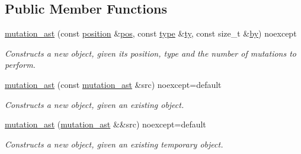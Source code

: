 \subsection*{Public Member Functions}
\begin{DoxyCompactItemize}
\item 
\hypertarget{classbfjit_1_1mutation__ast_aa4c4051e73b3e286a7587264de13c6fb}{}\label{classbfjit_1_1mutation__ast_aa4c4051e73b3e286a7587264de13c6fb} 
\hyperlink{classbfjit_1_1mutation__ast_aa4c4051e73b3e286a7587264de13c6fb}{mutation\+\_\+ast} (const \hyperlink{classbfjit_1_1position}{position} \&\hyperlink{classbfjit_1_1ast_a748b75683a33e11ad87b907ba0118c3d}{pos}, const \hyperlink{classbfjit_1_1mutation__ast_a4a35ab616dab7944deedac4300f473e9}{type} \&\hyperlink{classbfjit_1_1mutation__ast_a8f80ac1d17d4c77c1e5032f970e15e8e}{ty}, const size\+\_\+t \&\hyperlink{classbfjit_1_1mutation__ast_a2ee0d76e3a8aabee083952aea21035a5}{by}) noexcept
\begin{DoxyCompactList}\small\item\em Constructs a new object, given its position, type and the number of mutations to perform. \end{DoxyCompactList}\item 
\hypertarget{classbfjit_1_1mutation__ast_a13a88c3bab4ad64b00c5f00cb553a4df}{}\label{classbfjit_1_1mutation__ast_a13a88c3bab4ad64b00c5f00cb553a4df} 
\hyperlink{classbfjit_1_1mutation__ast_a13a88c3bab4ad64b00c5f00cb553a4df}{mutation\+\_\+ast} (const \hyperlink{classbfjit_1_1mutation__ast}{mutation\+\_\+ast} \&src) noexcept=default
\begin{DoxyCompactList}\small\item\em Constructs a new object, given an existing object. \end{DoxyCompactList}\item 
\hypertarget{classbfjit_1_1mutation__ast_a79a438bf768cea7e786ff38c971dd9aa}{}\label{classbfjit_1_1mutation__ast_a79a438bf768cea7e786ff38c971dd9aa} 
\hyperlink{classbfjit_1_1mutation__ast_a79a438bf768cea7e786ff38c971dd9aa}{mutation\+\_\+ast} (\hyperlink{classbfjit_1_1mutation__ast}{mutation\+\_\+ast} \&\&src) noexcept=default
\begin{DoxyCompactList}\small\item\em Constructs a new object, given an existing temporary object. \end{DoxyCompactList}\item 
\hypertarget{classbfjit_1_1mutation__ast_ae92ede7339103c1552ce76a4578c6bf7}{}\label{classbfjit_1_1mutation__ast_ae92ede7339103c1552ce76a4578c6bf7} 

\end{DoxyCompactItemize}
